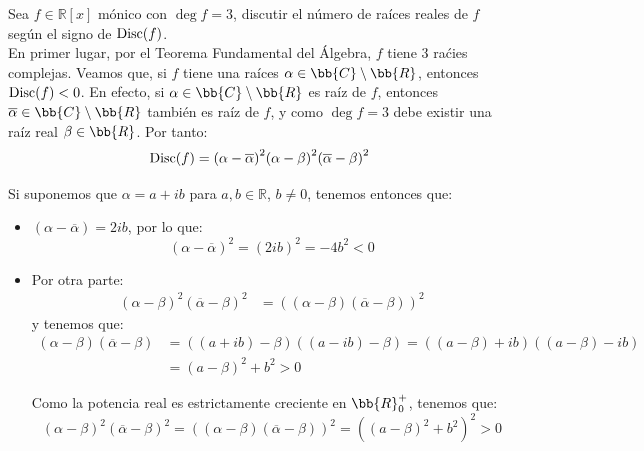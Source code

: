 \begin{ejercicio} \label{ej:signo_disc}
    Sea $f\in \mathbb{R}[x]$ mónico con $\deg f = 3$, discutir el número de raíces reales de $f$ según el signo de $\operatorname{Disc}(f)$.\\

    En primer lugar, por el Teorema Fundamental del Álgebra, $f$ tiene $3$ raćies complejas. Veamos que, si $f$ tiene una raíces $\alpha\in \bb{C}\setminus\bb{R}$, entonces $\operatorname{Disc}(f)<0$. En efecto, si $\alpha\in \bb{C}\setminus\bb{R}$ es raíz de $f$, entonces $\overline{\alpha}\in \bb{C}\setminus\bb{R}$ también es raíz de $f$, y como $\deg f = 3$ debe existir una raíz real $\beta\in \bb{R}$. Por tanto:
    \begin{equation*}
        \operatorname{Disc}(f) = {(\alpha-\overline{\alpha})}^{2}{(\alpha-\beta)}^{2}{(\overline{\alpha}-\beta)}^{2}
    \end{equation*}

    Si suponemos que $\alpha = a+ib$ para $a,b\in \mathbb{R}$, $b\neq 0$, tenemos entonces que:
    \begin{itemize}
        \item $(\alpha-\overline{\alpha}) = 2ib$, por lo que:
        \begin{equation*}
            {(\alpha-\overline{\alpha})}^{2} = {(2ib)}^{2} = -4b^2 < 0
        \end{equation*}

        \item Por otra parte:
            \begin{align*}
                {(\alpha-\beta)}^{2}{(\overline{\alpha}-\beta)}^{2} &= {((\alpha-\beta)(\overline{\alpha}-\beta))}^{2}
            \end{align*}
            y tenemos que:
            \begin{align*}
                (\alpha-\beta)(\overline{\alpha}-\beta) &= ((a+ib)-\beta)((a-ib)-\beta) = ((a-\beta)+ib)((a-\beta)-ib) \\ &= {(a-\beta)}^{2} + b^2> 0
            \end{align*}

            Como la potencia real es estrictamente creciente en $\bb{R}^+_0$, tenemos que:
            \begin{equation*}
                {(\alpha-\beta)}^{2}{(\overline{\alpha}-\beta)}^{2} = {((\alpha-\beta)(\overline{\alpha}-\beta))}^{2} = {({(a-\beta)}^{2} + b^2)}^{2} > 0
            \end{equation*}
    \end{itemize}


\end{ejercicio}
